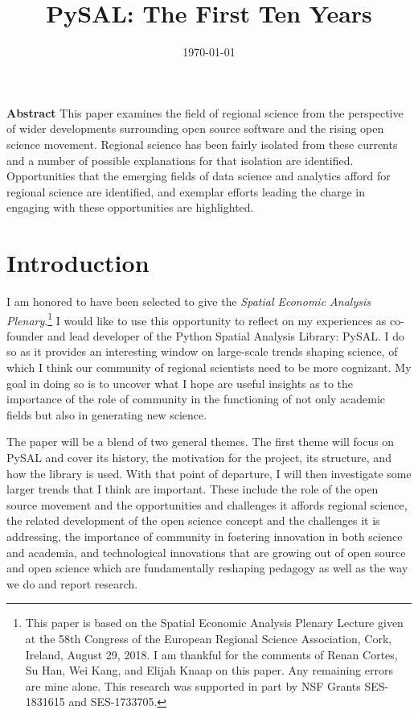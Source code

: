 \documentclass[11pt]{article}
\date{\today}
\title{PySAL: The First Ten Years}
\begin{document}
\maketitle
\textbf{Abstract} This paper examines the field of regional science from the
perspective of wider developments surrounding open source software and the
rising open science movement. Regional science has been fairly isolated from
these currents and a number of possible explanations for that isolation are
identified. Opportunities that the emerging fields of data science and
analytics afford for regional science are identified, and exemplar efforts
leading the charge in engaging with these opportunities are highlighted.


\section*{Introduction}
\label{sec:org8bcb62c}

I am honored to have been selected to give the \emph{Spatial Economic Analysis
Plenary}.\footnote{This paper is based on the Spatial Economic Analysis Plenary Lecture
given at the 58th Congress of the European Regional Science Association, Cork,
Ireland, August 29, 2018. I am thankful for the comments of Renan Cortes, Su
Han, Wei Kang, and Elijah Knaap on this paper. Any remaining errors are mine
alone. This research was supported in part by NSF Grants SES-1831615 and
SES-1733705.} I would like to use this opportunity to reflect on my experiences as
co-founder and lead developer of the Python Spatial Analysis Library: PySAL. I
do so as it provides an interesting window on large-scale trends shaping
science, of which I think our community of regional scientists need to be more
cognizant. My goal in doing so is to uncover what I hope are useful insights
as to the importance of the role of community in the functioning of not only
academic fields but also in generating new science.


The paper will be a blend of two general themes. The first theme will focus on
PySAL and cover its history, the motivation for the project, its structure, and
how  the library is used. With that point of departure, I will then
investigate some  larger trends that I think are important. These
include the role of the open source movement and the opportunities and
challenges it affords regional science, the related development of the open
science concept and the challenges it is addressing, the importance of
community in fostering innovation in both science and academia, and
technological innovations that are growing out of open source and open science
which are fundamentally reshaping pedagogy as well as the way we do and report
research.
\end{document}
